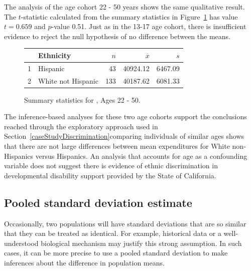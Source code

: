 The analysis of the age cohort 22 - 50 years shows the same qualitative result. The $t$-statistic calculated from the summary statistics in Figure~\ref{ddsExpEthnicityAge22Table} has value $t = 0.659$ and $p$-value 0.51. Just as in the 13-17 age cohort, there is insufficient evidence to reject the null hypothesis of no difference between the means.

\begin{figure}[h]
\centering
\begin{tabular}{rlrrr}
  \hline
 & Ethnicity & $n$ & $\overline{x}$ & $s$ \\ 
  \hline
1 & Hispanic &  43 & 40924.12 & 6467.09 \\ 
  2 & White not Hispanic & 133 & 40187.62 & 6081.33 \\ 
   \hline
\end{tabular}
\caption{Summary statistics for , Ages 22 - 50.} 
\label{ddsExpEthnicityAge22Table}
\end{figure}

The inference-based analyses for these two age cohorts support the conclusions reached through the exploratory approach used in Section~\ref{caseStudyDiscrimination}\textemdash comparing individuals of similar ages shows that there are not large differences between mean expenditures for White non-Hispanics versus Hispanics. An analysis that accounts for age as a confounding variable does not suggest there is evidence of ethnic discrimination in developmental disability support provided by the State of California.



\textD{\newpage}


\subsection{Pooled standard deviation estimate}
\label{pooledStandardDeviations}

Occasionally, two populations will have standard deviations that are so similar that they can be treated as identical. For example, historical data or a well-understood biological mechanism may justify this strong assumption. In such cases, it can be more precise to use a pooled standard deviation to make inferences about the difference in population means.


